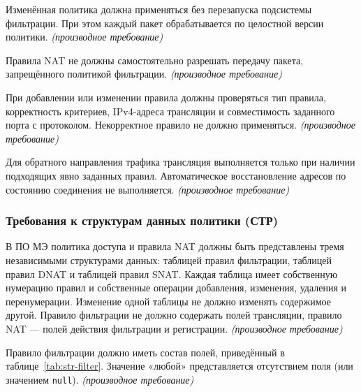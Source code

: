 \documentclass[12pt,a4paper,final]{article}
\newenvironment{reqs}
  {\begin{description}[style=sameline,leftmargin=2.2cm,labelwidth=2.0cm,
     labelsep=0.2cm,font=\normalfont\bfseries,itemsep=3pt]}
  {\end{description}}
\newcommand{\der}{\textit{(производное требование)}}
\begin{document}
\begin{reqs}
\item[НАТ-10] Изменённая политика должна применяться без перезапуска подсистемы фильтрации. При этом каждый пакет обрабатывается по целостной версии политики. \der
\item[НАТ-11] Правила NAT не должны самостоятельно разрешать передачу пакета, запрещённого политикой фильтрации. \der
\item[НАТ-12] При добавлении или изменении правила должны проверяться тип правила, корректность критериев, IPv4-адреса трансляции и совместимость заданного порта с протоколом. Некорректное правило не должно применяться. \der
\item[НАТ-13] Для обратного направления трафика трансляция выполняется только при наличии подходящих явно заданных правил. Автоматическое восстановление адресов по состоянию соединения не выполняется. \der
\end{reqs}

\subsubsection{Требования к структурам данных политики (СТР)}
\begin{reqs}
\item[СТР-01] В ПО МЭ политика доступа и правила NAT должны быть представлены
  тремя независимыми структурами данных: таблицей правил фильтрации, таблицей
  правил DNAT и таблицей правил SNAT. Каждая таблица имеет собственную
  нумерацию правил и собственные операции добавления, изменения, удаления и
  перенумерации. Изменение одной таблицы не должно изменять содержимое
  другой. Правило фильтрации не должно содержать полей трансляции, правило
  NAT --- полей действия фильтрации и регистрации. \der
\item[СТР-02] Правило фильтрации должно иметь состав полей, приведённый в
  таблице~\ref{tab:str-filter}. Значение «любой» представляется отсутствием
  поля (или значением \texttt{null}). \der
\end{reqs}
 
\end{document}
